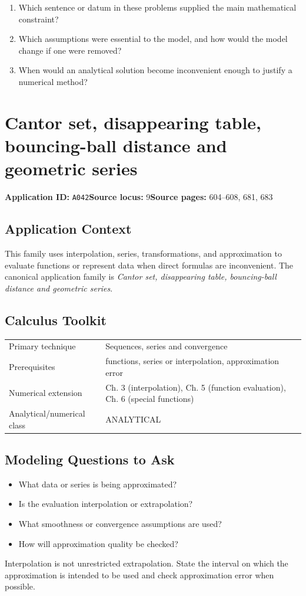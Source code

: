 \documentclass[11pt]{book}
\newcommand{\pid}[1]{\texttt{#1}}
\begin{document}
\begin{reflectionbox}\begin{enumerate}
\item Which sentence or datum in these problems supplied the main mathematical constraint?
\item Which assumptions were essential to the model, and how would the model change if one were removed?
\item When would an analytical solution become inconvenient enough to justify a numerical method?
\end{enumerate}\end{reflectionbox}
\chapter{Cantor set, disappearing table, bouncing-ball distance and geometric series}\label{app:A042}
\textbf{Application ID:} \pid{A042}\quad \textbf{Source locus:} 9\quad \textbf{Source pages:} 604–608, 681, 683
\section*{Application Context}
This family uses interpolation, series, transformations, and approximation to evaluate functions or represent data when direct formulas are inconvenient. The canonical application family is \emph{Cantor set, disappearing table, bouncing-ball distance and geometric series}.
\section*{Calculus Toolkit}
\begin{tabularx}{\textwidth}{@{}lX@{}}\toprule
Primary technique & Sequences, series and convergence \\
Prerequisites & functions, series or interpolation, approximation error \\
Numerical extension & Ch. 3 (interpolation), Ch. 5 (function evaluation), Ch. 6 (special functions) \\
Analytical/numerical class & ANALYTICAL \\
\bottomrule\end{tabularx}
\section*{Modeling Questions to Ask}\begin{itemize}
\item What data or series is being approximated?
\item Is the evaluation interpolation or extrapolation?
\item What smoothness or convergence assumptions are used?
\item How will approximation quality be checked?
\end{itemize}
\begin{errorbox}Interpolation is not unrestricted extrapolation. State the interval on which the approximation is intended to be used and check approximation error when possible.\end{errorbox}
\end{document}
